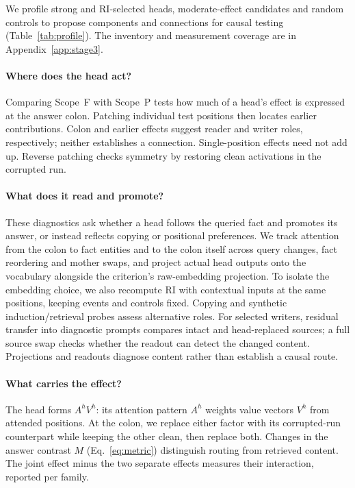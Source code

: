 We profile strong and RI-selected heads, moderate-effect candidates and random
controls to propose components and connections for causal testing
(Table~\ref{tab:profile}). The inventory and measurement coverage are in
Appendix~\ref{app:stage3}.

\paragraph{Where does the head act?}
Comparing Scope~F with Scope~P tests how much of a head's effect is expressed at
the answer colon. Patching individual test positions then locates earlier
contributions. Colon and earlier effects suggest reader and writer roles,
respectively; neither establishes a connection. Single-position effects need not
add up. Reverse patching checks symmetry by restoring clean activations in the
corrupted run.

\paragraph{What does it read and promote?}
These diagnostics ask whether a head follows the queried fact and promotes its
answer, or instead reflects copying or positional preferences. We track attention
from the colon to fact entities and to the colon itself across query changes, fact reordering and
mother swaps, and project actual head outputs onto the vocabulary alongside the
criterion's raw-embedding projection. To isolate the embedding choice, we also
recompute RI with contextual inputs at the same positions, keeping events and
controls fixed. Copying and synthetic induction/retrieval probes assess alternative
roles. For selected writers, residual transfer into diagnostic prompts compares
intact and head-replaced sources; a full source swap checks whether the readout
can detect the changed content. Projections and readouts diagnose content rather
than establish a causal route.

\paragraph{What carries the effect?}
The head forms $A^hV^h$: its attention pattern $A^h$ weights value vectors $V^h$
from attended positions. At the colon, we replace either factor with its
corrupted-run counterpart while keeping the other clean, then replace both.
Changes in the answer contrast $M$ (Eq.~\ref{eq:metric}) distinguish routing from
retrieved content. The joint effect minus the two separate effects measures their
interaction, reported per family.

